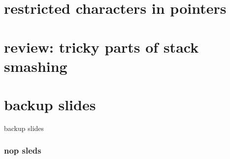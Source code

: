 \section{restricted characters in pointers}


\section{review: tricky parts of stack smashing}







\section{backup slides}
\begin{frame}{backup slides}
\end{frame}

\subsubsection{nop sleds}





